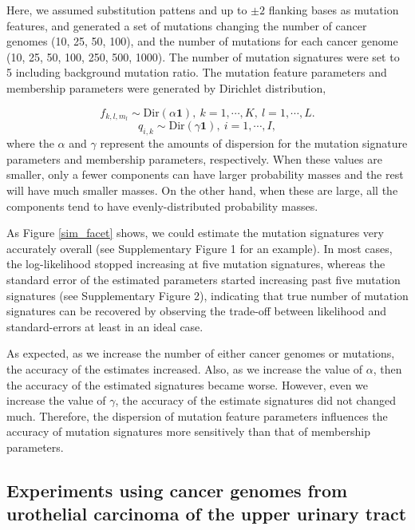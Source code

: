 Here, we assumed substitution pattens and up to $\pm 2$ flanking bases as mutation features,
and generated a set of mutations changing the number of cancer genomes (10, 25, 50, 100), 
and the number of mutations for each cancer genome (10, 25, 50, 100, 250, 500, 1000).
The number of mutation signatures were set to 5 including background mutation ratio.
The mutation feature parameters and membership parameters were generated by Dirichlet distribution,

\begin{equation*}
 f_{k,l,m_l} \sim \text{Dir} (\alpha \bm{1} ),\ k = 1, \cdots, K,\  l = 1, \cdots, L.
\end{equation*}
 \begin{equation*}
 q_{i, k} \sim \text{Dir} (\gamma \bm{1} ),\ i = 1, \cdots, I,
 \end{equation*}
where the $\alpha$ and $\gamma$ represent the amounts of dispersion 
for the mutation signature parameters and membership parameters, respectively.
When these values are smaller, only a fewer components can have larger probability masses and the rest will have much smaller masses.
On the other hand, when these are large, all the components tend to have evenly-distributed probability masses.
 
As Figure \ref{sim_facet} shows, we could estimate the mutation signatures very accurately overall (see Supplementary Figure 1 for an example).
In most cases, the log-likelihood stopped increasing at five mutation signatures, 
whereas the standard error of the estimated parameters started increasing past five mutation signatures (see Supplementary Figure 2),
indicating that true number of mutation signatures can be recovered by observing the trade-off between likelihood and standard-errors at least in an ideal case.

As expected, as we increase the number of either cancer genomes or mutations, the accuracy of the estimates increased.
Also, as we increase the value of $\alpha$, then the accuracy of the estimated signatures became worse.
However, even we increase the value of $\gamma$, the accuracy of the estimate signatures did not changed much.
Therefore, the dispersion of mutation feature parameters influences the accuracy of mutation signatures
more sensitively than that of membership parameters.


\subsection*{Experiments using cancer genomes from urothelial carcinoma of the upper urinary tract}

